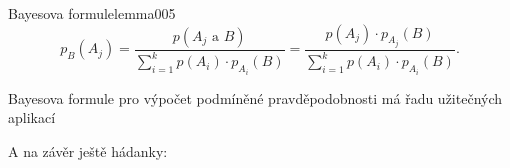      \begin{lemma}{Bayesova formule}{lemma005}
          \begin{equation}\label{mai:eq058}
            p_B(A_j) = \dfrac{p(A_j\text{ a }B)}{\sum_{i=1}^{k}p(A_i)\cdot p_{A_i}(B)} 
                     = \dfrac{p(A_j)\cdot p_{A_j}(B)}{\sum_{i=1}^{k}p(A_i)\cdot p_{A_i}(B)} .
          \end{equation}
      \end{lemma}
      
      Bayesova formule pro výpočet podmíněné pravděpodobnosti má řadu užitečných aplikací
      
      
      
      A na závěr ještě hádanky:

      
      
      
